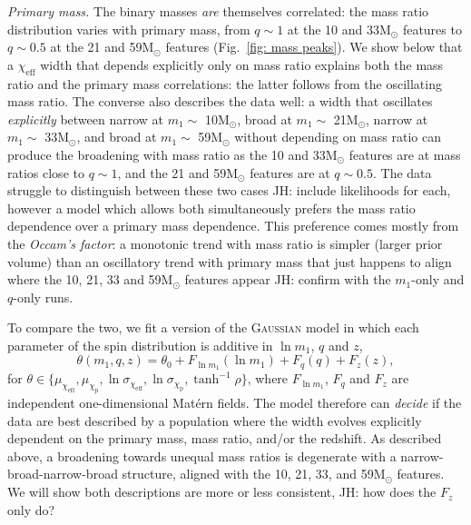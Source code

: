 \documentclass[%
    aps,
    prl,
    reprint,
    superscriptaddress,
    nolongbibliography,
    nobibnotes,
    nofootinbib,
    linenumbers,
    amsmath,amssymb,
]{revtex4-2}
\newcommand{\Msun}{\ensuremath{\mathrm{M}_{\odot}}}
\newcommand{\chieff}{\ensuremath{\chi_{\mathrm{eff}}}}
\newcommand{\chip}{\ensuremath{\chi_{\mathrm{p}}}}
\newcommand{\jh}[1]{{\color{orange}JH: #1}}
\newcommand{\gaussianspins}{\textsc{Gaussian}\xspace}
\newcommand{\featTen}{10\xspace}
\newcommand{\featTwenty}{21\xspace}
\newcommand{\featThirtyFive}{33\xspace}
\newcommand{\featSixty}{59\xspace}
\begin{document}
\textit{Primary mass.} The binary masses \textit{are} themselves correlated: the mass ratio distribution varies with primary mass, from $q \sim 1$ at the \featTen and \featThirtyFive $\Msun$ features to $q \sim 0.5$ at the \featTwenty and \featSixty $\Msun$ features (Fig.~\ref{fig: mass peaks}). We show below that a $\chieff$ width that depends explicitly only on mass ratio explains both the mass ratio and the primary mass correlations: the latter follows from the oscillating mass ratio. The converse also describes the data well: a width that oscillates \textit{explicitly} between narrow at $m_1\sim$ \featTen $\Msun$, broad at $m_1\sim$ \featTwenty $\Msun$, narrow at $m_1\sim$ \featThirtyFive $\Msun$, and broad at $m_1\sim$ \featSixty $\Msun$ without depending on mass ratio can produce the broadening with mass ratio as the \featTen and \featThirtyFive $\Msun$ features are at mass ratios close to $q\sim1$, and the \featTwenty and \featSixty $\Msun$ features are at $q\sim 0.5$. 
The data struggle to distinguish between these two cases \jh{include likelihoods for each}, however a model which allows both simultaneously prefers the mass ratio dependence over a primary mass dependence. This preference comes mostly from the \textit{Occam's factor}: a monotonic trend with mass ratio is simpler (larger prior volume) than an oscillatory trend with primary mass that just happens to align where the \featTen, \featTwenty, \featThirtyFive and \featSixty $\Msun$ features appear \jh{confirm with the $m_1$-only and $q$-only runs}. 

To compare the two, we fit a version of the \gaussianspins model in which each parameter of the spin distribution is additive in $\ln m_1$, $q$ and $z$,
\begin{equation}
    \theta(m_1, q, z) = \theta_0 + F_{\ln m_1}(\ln m_1) + F_q(q) + F_z(z),
    \label{eq: additive}
\end{equation}
for $\theta \in \{\mu_{\chieff}, \mu_{\chip}, \ln\sigma_{\chieff}, \ln\sigma_{\chip}, \tanh^{-1}\rho\}$, where $F_{\ln m_1}$, $F_q$ and $F_z$ are independent one-dimensional Mat\'ern fields. The model therefore can \textit{decide} if the data are best described by a population where the width evolves explicitly dependent on the primary mass, mass ratio, and/or the redshift. As described above, a broadening towards unequal mass ratios is degenerate with a narrow-broad-narrow-broad structure, aligned with the \featTen, \featTwenty, \featThirtyFive, and \featSixty $\Msun$ features. We will show both descriptions are more or less consistent, \jh{how does the $F_z$ only do?}
\end{document}

